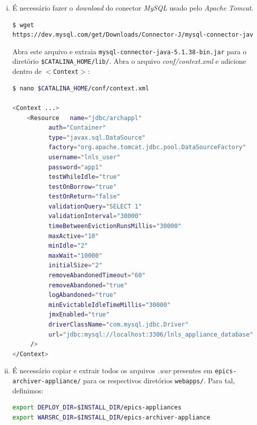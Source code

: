 \begin {enumerate}[i.]
\begin{lstlisting}[language=bash, style=nonumbers]
$ mysql -u lnls_user -p
>> USE lnls_appliance_database
>> source
$INSTALL_DIR/epics-archiver-appliance/install_scripts/archappl_mysql.sql
\end{lstlisting}

\item É necessário fazer o \textit{download} do conector \textit{MySQL} usado
pelo \textit{Apache Tomcat}.

\begin{lstlisting}[language=bash, style=nonumbers]
$ wget
https://dev.mysql.com/get/Downloads/Connector-J/mysql-connector-java-5.1.38.tar.gz
\end{lstlisting} 

Abra este arquivo e extraia \texttt{mysql-connector-java-5.1.38-bin.jar} para o
diretório \texttt{\$CATALINA\_HOME/lib/}. Abra o arquivo
\textit{conf/context.xml} e adicione dentro de \texttt{\(<\)Context\(>\)}:

\begin{lstlisting}[language=bash, style=nonumbers]
$ nano $CATALINA_HOME/conf/context.xml

<Context ...>
	<Resource   name="jdbc/archappl"
	      auth="Container"
	      type="javax.sql.DataSource"
	      factory="org.apache.tomcat.jdbc.pool.DataSourceFactory"
	      username="lnls_user"
	      password="app1" 
	      testWhileIdle="true"
	      testOnBorrow="true"
	      testOnReturn="false"
	      validationQuery="SELECT 1"
	      validationInterval="30000"
	      timeBetweenEvictionRunsMillis="30000"
	      maxActive="10" 
	      minIdle="2" 
	      maxWait="10000" 
	      initialSize="2"
	      removeAbandonedTimeout="60"
	      removeAbandoned="true"
	      logAbandoned="true"
	      minEvictableIdleTimeMillis="30000" 
	      jmxEnabled="true"
	      driverClassName="com.mysql.jdbc.Driver"
	      url="jdbc:mysql://localhost:3306/lnls_appliance_database"
	 />
</Context>
\end{lstlisting}

\item É necessário copiar e extrair todos os arquivos \textit{.war} presentes em
\texttt{epics-archiver-appliance/} para os respectivos diretórios
\texttt{webapps/}. Para tal, definimos:

\begin{lstlisting}[language=bash, style=nonumbers]
export DEPLOY_DIR=$INSTALL_DIR/epics-appliances
export WARSRC_DIR=$INSTALL_DIR/epics-archiver-appliance
\end{lstlisting}


\end{enumerate}

